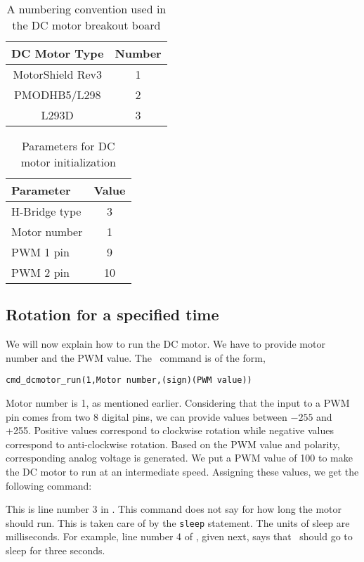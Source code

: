 \begin{table}
\centering
\caption{A numbering convention used in the DC motor breakout board}
\label{table:convention}
\begin{tabular}{|c|c|}\hline
DC Motor Type & Number \\ \hline
MotorShield Rev3 & 1 \\
PMODHB5/L298 & 2 \\
L293D & 3 \\ \hline
\end{tabular}
\end{table}
\begin{table}
\centering
\caption{Parameters for DC motor initialization}
\label{tab:dcmotor-init}
\begin{tabular}{|l|c|} \hline
Parameter & Value \\ \hline
H-Bridge type & 3 \\ 
Motor number & 1 \\
PWM 1 pin & 9 \\
PWM 2 pin & 10 \\ \hline
\end{tabular}
\end{table}

\subsection{Rotation for a specified time}
\label{sec:dc-both}
We will now explain how to run the DC motor.  We have to provide motor
number and the PWM value.  The \scilab\ command is of the form,
\begin{lstlisting}[style=nonumbers]
  cmd_dcmotor_run(1,Motor number,(sign)(PWM value))
\end{lstlisting}
Motor number is 1, as mentioned earlier.  Considering that the input
to a PWM pin comes from two 8 digital pins, we can provide values
between $-255$ and +255. Positive values correspond to clockwise
rotation while negative values correspond to anti-clockwise rotation.
Based on the PWM value and polarity, corresponding analog voltage is
generated.  We put a PWM value of 100 to make the DC motor to
run at an intermediate speed.  Assigning these values, we get the
following command:

This is line number 3 in .  This command
does not say for how long the motor should run.  This is taken care of
by the {\tt sleep} statement.  The units of sleep are milliseconds.
For example, line number 4 of , given next,
says that \scilab\ should go to sleep for three seconds.


